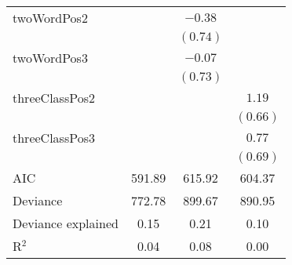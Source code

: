 \begin{table}
\begin{center}
\begin{tabular}{l c c c }
twoWordPos2               &              & $-0.38$      &            \\
                          &              & $(0.74)$     &            \\
twoWordPos3               &              & $-0.07$      &            \\
                          &              & $(0.73)$     &            \\
threeClassPos2            &              &              & $1.19$     \\
                          &              &              & $(0.66)$   \\
threeClassPos3            &              &              & $0.77$     \\
                          &              &              & $(0.69)$   \\
\hline
AIC                       & 591.89       & 615.92       & 604.37     \\
Deviance                  & 772.78       & 899.67       & 890.95     \\
Deviance explained        & 0.15         & 0.21         & 0.10       \\
R$^2$                     & 0.04         & 0.08         & 0.00       \\

\end{tabular}
\end{center}
\end{table}
